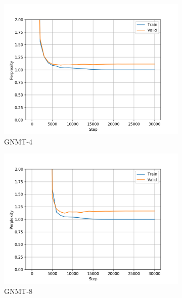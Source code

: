 \begin{figure}[H]
\begin{subfigure}{0.45\textwidth}
\includegraphics[width=\textwidth]{../results/monument_600/run1/wmt16_gnmt_4_layer/ppls.png} 
\caption{GNMT-4}
\label{fig:monu600 gnmt4 ppl}
\end{subfigure}
\hfill
\begin{subfigure}{0.45\textwidth}
\includegraphics[width=\textwidth]{../results/monument_600/run1/wmt16_gnmt_8_layer/ppls.png}
\caption{GNMT-8}
\label{fig:monu600 gnmt8 ppl}
\end{subfigure}
\hfill
\begin{subfigure}{0.45\textwidth}

\end{subfigure}
\end{figure}

